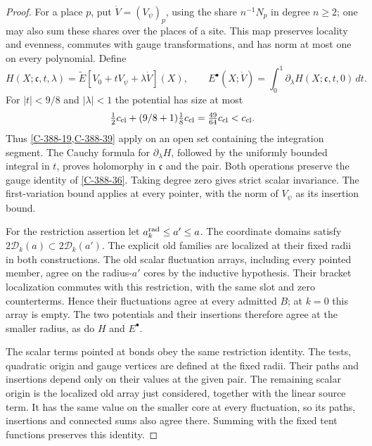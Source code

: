 \documentclass[11pt,letterpaper,reqno]{amsart}
\theoremstyle{definition}
\theoremstyle{remark}
\begin{document}
\begin{proof}
For a place $p$, put $\dot V=(V_\psi)_p$, using the share
$n^{-1}N_p$ in degree $n\ge2$; one may also sum these shares
over the places of a site. This map preserves locality and
evenness, commutes with gauge transformations, and has norm
at most one on every polynomial. Define
\[
 H(X;\mathfrak c,t,\lambda)
   =\widetilde E[V_0+tV_\psi+\lambda\dot V](X),\qquad
 E^\bullet(X;\dot V)
   =\int_0^1\partial_\lambda H(X;\mathfrak c,t,0)\,dt.
\]
For $|t|<9/8$ and $|\lambda|<1$ the potential has size at most
\[
 \tfrac12c_{\rm cl}+(9/8+1)\tfrac18c_{\rm cl}
       =\tfrac{49}{64}c_{\rm cl}<c_{\rm cl}.
\]
Thus \cref{C-388-19,C-388-39} apply on an open set containing
the integration segment. The Cauchy formula for
$\partial_\lambda H$, followed by the uniformly bounded
integral in $t$, proves holomorphy in $\mathfrak c$ and the
pair. Both operations preserve the gauge identity of
\cref{C-388-36}. Taking degree zero gives strict scalar
invariance. The first-variation bound applies at every
pointer, with the norm of $V_\psi$ as its insertion bound.

For the restriction assertion let $a_k^{\rm rad}\le a'\le a$.
The coordinate domains satisfy
$2\mathscr D_k(a)\subset2\mathscr D_k(a')$.
The explicit old families are localized at their fixed radii
in both constructions. The old scalar fluctuation arrays,
including every pointed member, agree on the radius-$a'$
cores by the inductive hypothesis. Their bracket localization
commutes with this restriction, with the same slot and zero
counterterms. Hence their fluctuations agree at every admitted
$B$; at $k=0$ this array is empty. The two potentials and their
insertions therefore agree at the smaller radius, as do $H$
and $E^\bullet$.

The scalar terms pointed at bonds obey the same restriction
identity. The tests, quadratic origin and gauge vertices are
defined at the fixed radii. Their paths and insertions depend
only on their values at the given pair. The remaining scalar
origin is the localized old array just considered, together
with the linear source term. It has the same value on the
smaller core at every fluctuation, so its paths, insertions
and connected sums also agree there. Summing with the fixed
tent functions preserves this identity.


\end{proof}
\end{document}
